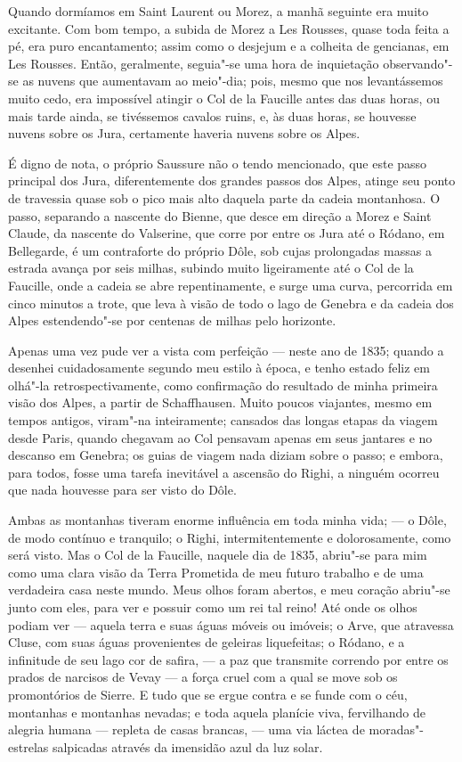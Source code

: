 Quando dormíamos em Saint Laurent ou Morez, a manhã seguinte era
muito excitante. Com bom tempo, a subida de Morez a Les Rousses, quase
toda feita a pé, era puro encantamento; assim como o desjejum e a
colheita de gencianas, em Les Rousses. Então, geralmente, seguia"-se uma
hora de inquietação observando"-se as nuvens que aumentavam ao meio"-dia;
pois, mesmo que nos levantássemos muito cedo, era impossível atingir o
Col de la Faucille antes das duas horas, ou mais tarde ainda, se
tivéssemos cavalos ruins, e, às duas horas, se houvesse nuvens sobre os
Jura, certamente haveria nuvens sobre os Alpes.

É digno de nota, o próprio Saussure não o tendo mencionado, que este
passo principal dos Jura, diferentemente dos grandes passos dos Alpes,
atinge seu ponto de travessia quase sob o pico mais alto daquela parte
da cadeia montanhosa. O passo, separando a nascente do Bienne, que desce
em direção a Morez e Saint Claude, da nascente do Valserine, que corre
por entre os Jura até o Ródano, em Bellegarde, é um contraforte do
próprio Dôle, sob cujas prolongadas massas a estrada avança por seis
milhas, subindo muito ligeiramente até o Col de la Faucille, onde a
cadeia se abre repentinamente, e surge uma curva, percorrida em cinco
minutos a trote, que leva à visão de todo o lago de Genebra e da cadeia
dos Alpes estendendo"-se por centenas de milhas pelo horizonte.

Apenas uma vez pude ver a vista com perfeição --- neste ano de 1835;
quando a desenhei cuidadosamente segundo meu estilo à época, e tenho
estado feliz em olhá"-la retrospectivamente, como confirmação do
resultado de minha primeira visão dos Alpes, a partir de Schaffhausen.
Muito poucos viajantes, mesmo em tempos antigos, viram"-na inteiramente;
cansados das longas etapas da viagem desde Paris, quando chegavam ao Col
pensavam apenas em seus jantares e no descanso em Genebra; os guias de
viagem nada diziam sobre o passo; e embora, para todos, fosse uma tarefa
inevitável a ascensão do Righi, a ninguém ocorreu que nada houvesse para
ser visto do Dôle.

Ambas as montanhas tiveram enorme influência em toda minha vida; --- o
Dôle, de modo contínuo e tranquilo; o Righi, intermitentemente e
dolorosamente, como será visto. Mas o Col de la Faucille, naquele dia de
1835, abriu"-se para mim como uma clara visão da Terra Prometida de meu
futuro trabalho e de uma verdadeira casa neste mundo. Meus olhos foram
abertos, e meu coração abriu"-se junto com eles, para ver e possuir como
um rei tal reino! Até onde os olhos podiam ver --- aquela terra e suas
águas móveis ou imóveis; o Arve, que atravessa Cluse, com suas águas
provenientes de geleiras liquefeitas; o Ródano, e a infinitude de seu
lago cor de safira, --- a paz que transmite correndo por entre os prados
de narcisos de Vevay --- a força cruel com a qual se move sob os
promontórios de Sierre. E tudo que se ergue contra e se funde com o céu,
montanhas e montanhas nevadas; e toda aquela planície viva, fervilhando
de alegria humana --- repleta de casas brancas, --- uma via láctea de
moradas"-estrelas salpicadas através da imensidão azul da luz solar.

